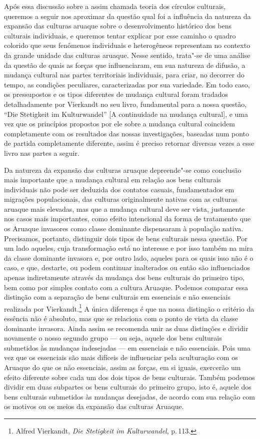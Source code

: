Após essa discussão sobre a assim chamada teoria dos círculos
culturais, queremos a seguir nos aproximar da questão qual foi a
influência da natureza da expansão das culturas aruaque sobre o
desenvolvimento histórico dos bens culturais individuais, e queremos
tentar explicar por esse caminho o quadro colorido que seus fenômenos
individuais e heterogêneos representam no contexto da grande unidade
das culturas aruaque. Nesse sentido, trata"-se de uma análise da questão
de quais as forças que influenciaram, em sua natureza de difusão, a
mudança cultural nas partes territoriais individuais, para criar, no
decorrer do tempo, as condições peculiares, caracterizadas por sua
variedade. Em todo caso, os pressupostos e os tipos diferentes de
mudança cultural foram tradados detalhadamente por Vierkandt no seu
livro, fundamental para a nossa questão, ``Die Stetigkeit im
Kulturwandel'' {[}A continuidade na mudança cultural{]}, e uma vez que
os princípios propostos por ele sobre a mudança cultural coincidem
completamente com os resultados das nossas investigações, baseadas num
ponto de partida completamente diferente, assim é preciso retornar
diversas vezes a esse livro nas partes a seguir.

Da natureza da expansão das culturas aruaque depreende"-se como
conclusão mais importante que a mudança cultural em relação aos bens
culturais individuais não pode ser deduzida dos contatos casuais,
fundamentados em migrações populacionais, das culturas originalmente
nativas com as culturas aruaque mais elevadas, mas que a mudança
cultural deve ser vista, justamente nos casos mais importantes, como
efeito intencional da forma de tratamento que os Aruaque invasores como
classe dominante dispensaram à população nativa. Precisamos, portanto,
distinguir dois tipos de bens culturais nessa questão. Por um lado
aqueles, cuja transformação está no interesse e por isso também na mira
da classe dominante invasora e, por outro lado, aqueles para os quais
isso não é o caso, e que, destarte, ou podem continuar inalterados ou
então são influenciados apenas indiretamente através da mudança dos bens
culturais do primeiro tipo, bem como por simples contato com a cultura
Aruaque. Podemos comparar essa distinção com a separação de bens
culturais em essenciais e não essenciais realizada por
Vierkandt.\footnote{Alfred Vierkandt, \textit{Die Stetigkeit im
  Kulturwandel}, p.\,113.} A única diferença é que na nossa distinção o
critério da essência não é absoluto, mas que se relaciona com o ponto de
vista da classe dominante invasora. Ainda assim se recomenda unir as
duas distinções e dividir novamente o nosso segundo grupo --- ou seja,
aquele dos bens culturais submetidos às mudanças indesejadas --- em
essenciais e não essenciais. Pois uma vez que os essenciais são mais
difíceis de influenciar pela aculturação com os Aruaque do que os
não essenciais, assim as forças, em si iguais, exercerão um efeito
diferente sobre cada um dos dois tipos de bens culturais. Também podemos
dividir em duas subpartes os bens culturais do primeiro grupo, isto é,
aquele dos bens culturais submetidos às mudanças desejadas, de acordo
com sua relação com os motivos ou os meios da expansão das culturas
Aruaque.

